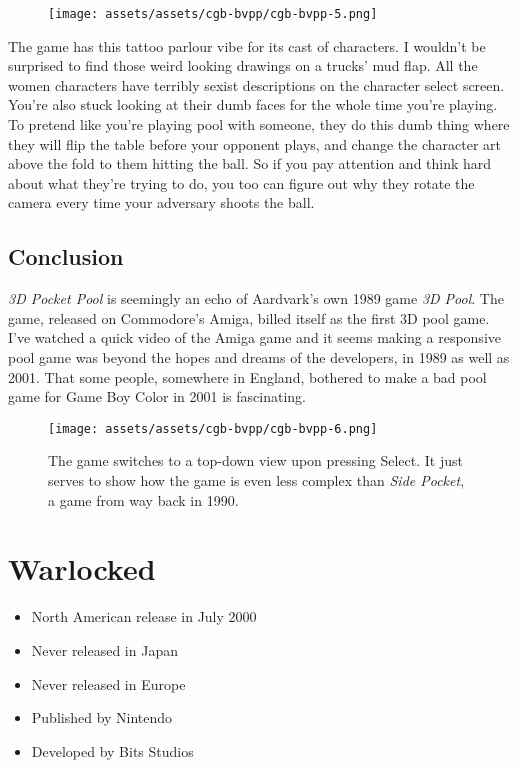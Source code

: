 \documentclass{book}
\begin{document}
\begin{figure}[hbt]
\vskip 10pt
\centering \texttt{[image: assets/assets/cgb-bvpp/cgb-bvpp-5.png]}
\vskip 6pt
\end{figure}
The game has this tattoo parlour vibe for its cast of characters. I wouldn’t be surprised to find those weird looking drawings on a trucks’ mud flap. All the women characters have terribly sexist descriptions on the character select screen. You’re also stuck looking at their dumb faces for the whole time you’re playing. To pretend like you’re playing pool with someone, they do this dumb thing where they will flip the table before your opponent plays, and change the character art above the fold to them hitting the ball. So if you pay attention and think hard about what they’re trying to do, you too can figure out why they rotate the camera every time your adversary shoots the ball.

\FloatBarrier\needspace{10mm}\section*{Conclusion}\nopagebreak[4]

\emph{3D Pocket Pool} is seemingly an echo of Aardvark’s own 1989 game \emph{3D Pool}. The game, released on Commodore’s Amiga, billed itself as the first 3D pool game. I’ve watched a quick video of the Amiga game and it seems making a responsive pool game was beyond the hopes and dreams of the developers, in 1989 as well as 2001. That some people, somewhere in England, bothered to make a bad pool game for Game Boy Color in 2001 is fascinating.

\begin{figure}[hbt]
\vskip 10pt
\centering \texttt{[image: assets/assets/cgb-bvpp/cgb-bvpp-6.png]}\par\pagetwodescription The game switches to a top-down view upon pressing Select. It just serves to show how the game is even less complex than \emph{Side Pocket}, a game from way back in 1990.
\vskip 6pt
\end{figure}


\begingroup \chapter*{Warlocked} \endgroup

\begin{itemize} \setlength\itemsep{-0.4em}
\item North American release in July 2000
\item Never released in Japan
\item Never released in Europe
\item Published by Nintendo
\item Developed by Bits Studios
\end{itemize}\noindent
\end{document}
